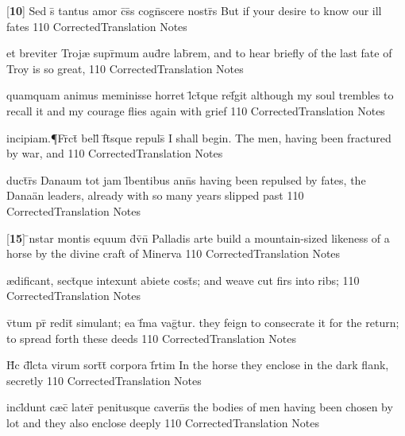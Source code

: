 \latline
  {[\textbf{10}] Sed s\={\macron {\i}} tantus amor c\={}s\={}s cogn\={}scere nostr\={}s }
  { But if your desire to know our ill fates }
  {110}
  { CorrectedTranslation }
  { Notes }


\latline
  {et breviter Troj{\ae} supr\={}mum aud\={\macron {\i}}re lab\={}rem,}
  { and to hear briefly of the last fate of Troy is so great, }
  {110}
  { CorrectedTranslation }
  { Notes }


\latline
  {quamquam animus meminisse horret l\={}ct\={}que ref\={}git}
  { although my soul trembles to recall it and my courage flies again with grief }
  {110}
  { CorrectedTranslation }
  { Notes }


\latline
  {incipiam.{\P}Fr\={}ct\={\macron {\i}} bell\={} f\={}t\={\macron {\i}}sque repuls\={\macron {\i}}}
  { I shall begin.  The men, having been fractured by war, and }
  {110}
  { CorrectedTranslation }
  { Notes }


\latline
  {duct\={}r\={}s Danaum tot jam l\={}bentibus ann\={\macron {\i}}s}
  { having been repulsed by fates, the Dana\"an leaders, already with so many years slipped past }
  {110}
  { CorrectedTranslation }
  { Notes }


\latline
  {[\textbf{15}] \={\macron {\i}}nstar montis equum d\={\macron {\i}}v\={\macron {\i}}n\={} Palladis arte}
  { build a mountain-sized likeness of a horse by the divine craft of Minerva }
  {110}
  { CorrectedTranslation }
  { Notes }


\latline
  {{\ae}dificant, sect\={}que intexunt abiete cost\={}s;}
  { and weave cut firs into ribs; }
  {110}
  { CorrectedTranslation }
  { Notes }


\latline
  {v\={}tum pr\={} redit\={} simulant; ea f\={}ma vag\={}tur.}
  { they feign to consecrate it for the return; to spread forth these deeds }
  {110}
  { CorrectedTranslation }
  { Notes }


\latline
  {H\={}c d\={}l\={}cta virum sort\={\macron {\i}}t\={\macron {\i}} corpora f\={}rtim}
  { In the horse they enclose in the dark flank, secretly }
  {110}
  { CorrectedTranslation }
  { Notes }


\latline
  {incl\={}dunt c{\ae}c\={} later\={\macron {\i}} penitusque cavern\={}s}
  { the bodies of men having been chosen by lot and they also enclose deeply }
  {110}
  { CorrectedTranslation }
  { Notes }


